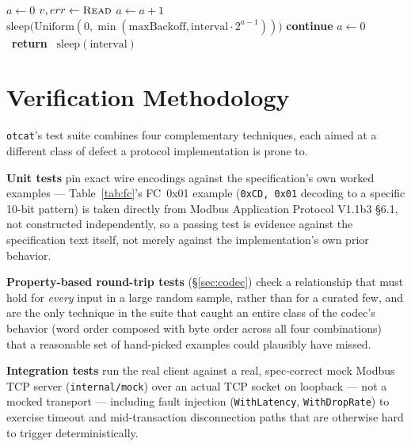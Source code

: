 \documentclass[10pt,conference]{IEEEtran}
\newcommand{\otcat}{\texttt{otcat}}
\newcommand{\code}[1]{\texttt{#1}}
\begin{document}
\begin{algorithm}[t]
\caption{\code{watch.Run} polling loop}
\label{alg:poll}
\begin{algorithmic}[1]
\State $a \gets 0$ 
  \State $v, err \gets \Call{Read}{}$
    \State $a \gets a + 1$
    \State $\mathrm{sleep}\bigl(\mathrm{Uniform}(0, \min(\mathrm{maxBackoff}, \mathrm{interval} \cdot 2^{a-1})) \bigr)$
    \State \textbf{continue}
  \EndIf
  \State $a \gets 0$
  \State {} 
  \ \textbf{return}\ \EndIf
  \State $\mathrm{sleep}(\mathrm{interval})$
\EndWhile
\end{algorithmic}
\end{algorithm}



\section{Verification Methodology}
\label{sec:verification}

\otcat's test suite combines four complementary techniques, each aimed
at a different class of defect a protocol implementation is prone to.

\textbf{Unit tests} pin exact wire encodings against the
specification's own worked examples --- Table~\ref{tab:fc}'s FC~0x01
example (\code{0xCD, 0x01} decoding to a specific 10-bit pattern) is
taken directly from Modbus Application Protocol V1.1b3 \S6.1, not
constructed independently, so a passing test is evidence against the
specification text itself, not merely against the implementation's own
prior behavior.

\textbf{Property-based round-trip tests} (\S\ref{sec:codec}) check a
relationship that must hold for \emph{every} input in a large random
sample, rather than for a curated few, and are the only technique in
the suite that caught an entire class of the codec's behavior (word
order composed with byte order across all four combinations) that a
reasonable set of hand-picked examples could plausibly have missed.

\textbf{Integration tests} run the real client against a real,
spec-correct mock Modbus TCP server (\code{internal/mock}) over an
actual TCP socket on loopback --- not a mocked transport --- including
fault injection (\code{WithLatency}, \code{WithDropRate}) to exercise
timeout and mid-transaction disconnection paths that are otherwise hard
to trigger deterministically.
\end{document}
